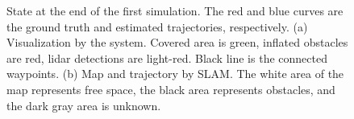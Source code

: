 \begin{figure}[h!]
    \centering
	\caption[State at the end of the first simulation.]{State at the end of the first simulation. The red and blue curves are the ground truth and estimated trajectories, respectively. (a) Visualization by the system. Covered area is green, inflated obstacles are red, lidar detections are light-red. Black line is the connected waypoints. (b) Map and trajectory by SLAM. The white area of the map represents free space, the black area represents obstacles, and the dark gray area is unknown.}
	\label{fig:bm1_res_res}
\end{figure}

